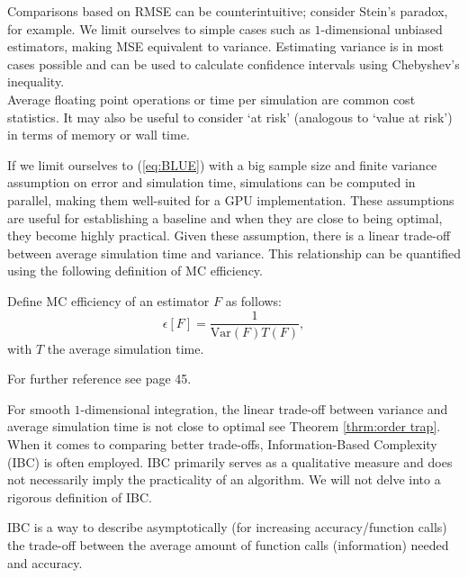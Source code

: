 \documentclass[a4paper,12pt]{article}
\begin{document}
Comparisons based on RMSE can be counterintuitive; consider Stein's paradox,
for example. We limit ourselves to simple cases such as $1$-dimensional
unbiased estimators, making MSE equivalent to variance.
Estimating variance is in most cases possible and can be used to calculate
confidence intervals using Chebyshev's inequality.\\

Average floating point operations or time per simulation are common cost statistics.
It may also be useful to consider \enquote*{at risk}  (analogous to \enquote*{value at risk})
in terms of memory or wall time.

If we limit ourselves to (\ref{eq:BLUE}) with a big sample size and
finite variance assumption on error and simulation time,
simulations can be computed in parallel, making them well-suited for a GPU implementation.
These assumptions are useful for establishing a baseline and
when they are close to being optimal, they become highly practical.
Given these assumption, there is a linear trade-off
between average simulation time and variance. This relationship can be quantified
using the following definition of MC efficiency.

\begin{definition}
  Define MC efficiency of an
  estimator $F$ as follows:
  \begin{equation}
    \epsilon[F]=\frac{1}{\text{Var}(F) T(F)},
  \end{equation}
  with $T$ the average simulation time.
\end{definition}

\begin{related}
  For further reference see \cite{veach_robust_1997} page 45.
\end{related}

For smooth $1$-dimensional integration, the linear trade-off between
variance and average simulation time is not close to optimal see
Theorem \ref{thrm:order trap}. \\
When it comes to comparing better trade-offs,
Information-Based Complexity (IBC) is often employed.
IBC primarily serves as a
qualitative measure and does not necessarily imply the
practicality of an algorithm. We will not delve into a
rigorous definition of IBC.

\begin{definition}
  IBC is a way to describe asymptotically (for increasing accuracy/function calls)
  the trade-off between the average amount of function calls (information)
  needed and accuracy.
\end{definition}
\end{document}
